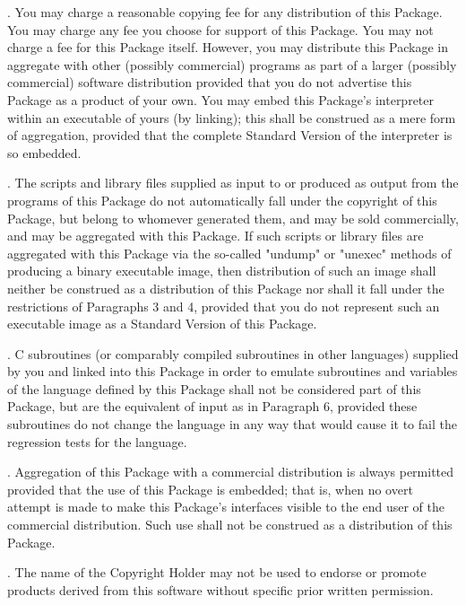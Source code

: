 \documentclass[10pt,letterpaper,titlepage]{article}
\begin{document}
. You may charge a reasonable copying fee for any distribution of this Package.  You may charge any fee you choose for support of this Package.  You may not charge a fee for this Package itself.  However, you may distribute this Package in aggregate with other (possibly commercial) programs as part of a larger (possibly commercial) software distribution provided that you do not advertise this Package as a product of your own.  You may embed this Package's interpreter within an executable of yours (by linking); this shall be construed as a mere form of aggregation, provided that the complete Standard Version of the interpreter is so embedded.
\vspace{8pt}

. The scripts and library files supplied as input to or produced as output from the programs of this Package do not automatically fall under the copyright of this Package, but belong to whomever generated them, and may be sold commercially, and may be aggregated with this Package.  If such scripts or library files are aggregated with this Package via the so-called "undump" or "unexec" methods of producing a binary executable image, then distribution of such an image shall neither be construed as a distribution of this Package nor shall it fall under the restrictions of Paragraphs 3 and 4, provided that you do not represent such an executable image as a Standard Version of this Package.
\vspace{8pt}

. C subroutines (or comparably compiled subroutines in other languages) supplied by you and linked into this Package in order to emulate subroutines and variables of the language defined by this Package shall not be considered part of this Package, but are the equivalent of input as in Paragraph 6, provided these subroutines do not change the language in any way that would cause it to fail the regression tests for the language.
\vspace{8pt}

. Aggregation of this Package with a commercial distribution is always permitted provided that the use of this Package is embedded; that is, when no overt attempt is made to make this Package's interfaces visible to the end user of the commercial distribution.  Such use shall not be construed as a distribution of this Package.
\vspace{8pt}

. The name of the Copyright Holder may not be used to endorse or promote products derived from this software without specific prior written permission.
\vspace{2pt}
\end{document}

